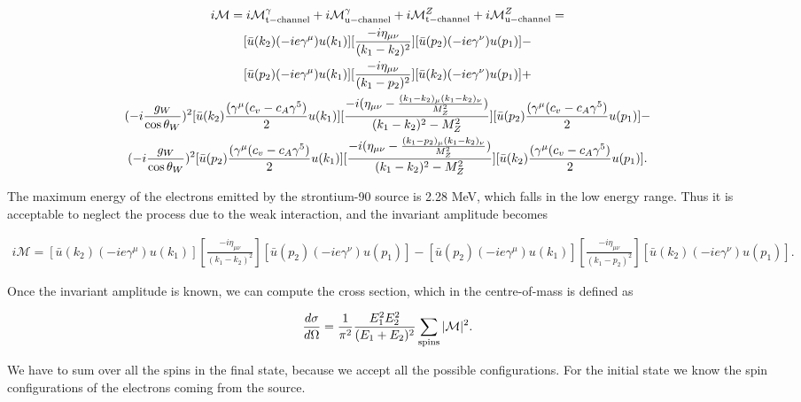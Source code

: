\documentclass[10pt,swedish, openany]{book}
\begin{document}
\begin{multline}
\\
     i\mathcal{M} = i\mathcal{M}^{\gamma}_{\rm t-channel} + i\mathcal{M}^{\gamma}_{\rm u-channel} + i\mathcal{M}^{Z}_{\rm t-channel} + i\mathcal{M}^{Z}_{\rm u-channel} =\\ [\bar{u}(k_2)(-ie\gamma^{\mu})u(k_1)][\frac{-i\eta_{\mu\nu}}{(k_1-k_2)^2}][\bar{u}(p_2)(-ie\gamma^{\nu})u(p_1)] -\\
    [\bar{u}(p_2)(-ie\gamma^{\mu})u(k_1)][\frac{-i\eta_{\mu\nu}}{(k_1-p_2)^2}][\bar{u}(k_2)(-ie\gamma^{\nu})u(p_1)] +\\
    (-i \frac{g_W}{\cos{\theta_W}})^2[\bar{u}(k_2)\frac{(\gamma^{\mu}(c_v - c_A\gamma^5)}{2}u(k_1)][\frac{-i(\eta_{\mu\nu}-\frac{(k_1-k_2)_{\mu}(k_1-k_2)_{\nu}}{M_Z^2})}{(k_1-k_2)^2-M_Z^2}][\bar{u}(p_2)\frac{(\gamma^{\mu}(c_v - c_A\gamma^5)}{2}u(p_1)] -\\
    (-i \frac{g_W}{\cos{\theta_W}})^2[\bar{u}(p_2)\frac{(\gamma^{\mu}(c_v - c_A\gamma^5)}{2}u(k_1)][\frac{-i(\eta_{\mu\nu}-\frac{(k_1-p_2)_{\mu}(k_1-k_2)_{\nu}}{M_Z^2})}{(k_1-k_2)^2-M_Z^2}][\bar{u}(k_2)\frac{(\gamma^{\mu}(c_v - c_A\gamma^5)}{2}u(p_1)].
\end{multline}

The maximum energy of the electrons emitted by the strontium-90 source is 2.28 MeV, which falls in the low energy range. Thus it is acceptable to neglect the process due to the weak interaction, and the invariant amplitude becomes

\begin{multline}
     i\mathcal{M} = [\bar{u}(k_2)(-ie\gamma^{\mu})u(k_1)][\frac{-i\eta_{\mu\nu}}{(k_1-k_2)^2}][\bar{u}(p_2)(-ie\gamma^{\nu})u(p_1)] -
    [\bar{u}(p_2)(-ie\gamma^{\mu})u(k_1)][\frac{-i\eta_{\mu\nu}}{(k_1-p_2)^2}][\bar{u}(k_2)(-ie\gamma^{\nu})u(p_1)] .
\end{multline}

Once the invariant amplitude is known, we can compute the cross section, which in the centre-of-mass is defined as

\begin{equation}
    \frac{d\sigma}{d\Omega} = \frac{1}{\pi^2}\frac{E_1^2E_2^2}{(E_1+E_2)^2} \sum_{\rm spins} |\mathcal{M}|^2.
\end{equation}

We have to sum over all the spins in the final state, because we accept all the possible configurations. For the initial state we know the spin configurations of the electrons coming from the source. 
\end{document}
